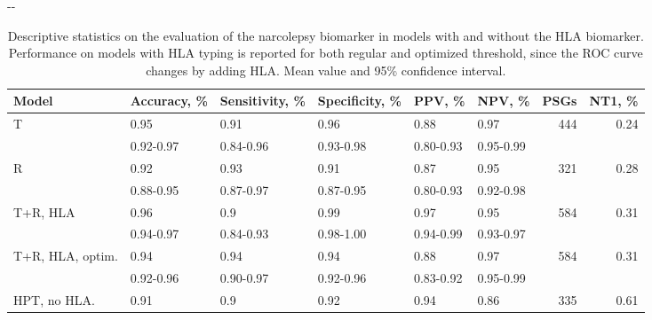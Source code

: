 \begin{table}
    \small
    \begin{adjustwidth*}{}{-\marginparwidth-\marginparsep}
    \caption[Narcolepsy biomarker performance]{Descriptive statistics on the evaluation of the narcolepsy biomarker in models with and without the \ac{HLA} biomarker. 
    Performance on models with \ac{HLA} typing is reported for both regular and optimized threshold, since the \ac{ROC} curve changes by adding \ac{HLA}. Mean value and 95\% confidence interval.}
    \label{tab:paperiii-supptable06}
    \begin{tabular}{@{}llllllrr@{}}
        \toprule
        \textbf{Model}      & \textbf{Accuracy}, \% & \textbf{Sensitivity}, \% & \textbf{Specificity}, \% & \textbf{PPV}, \%  & \textbf{NPV}, \%  & \textbf{\acp{PSG}} & \textbf{\ac{NT1}}, \% \\ \midrule
        T                   & 0.95          & 0.91             & 0.96             & 0.88      & 0.97      & 444       & 0.24                       \\
                            & 0.92-0.97     & 0.84-0.96        & 0.93-0.98        & 0.80-0.93 & 0.95-0.99 &           &                            \\
        R                   & 0.92          & 0.93             & 0.91             & 0.87      & 0.95      & 321       & 0.28                       \\
                            & 0.88-0.95     & 0.87-0.97        & 0.87-0.95        & 0.80-0.93 & 0.92-0.98 &           &                            \\
        \multirow[t]{2}{0.175\textwidth}{T+R, HLA} & 0.96          & 0.9              & 0.99             & 0.97      & 0.95      & 584       & 0.31                       \\
                            & 0.94-0.97     & 0.84-0.93        & 0.98-1.00        & 0.94-0.99 & 0.93-0.97 &           &                            \\
        \multirow[t]{2}{0.175\textwidth}{T+R, HLA, optim.}    & 0.94          & 0.94             & 0.94             & 0.88      & 0.97      & 584       & 0.31                       \\
                            & 0.92-0.96     & 0.90-0.97        & 0.92-0.96        & 0.83-0.92 & 0.95-0.99 &           &                            \\
        \multirow[t]{2}{0.175\textwidth}{HPT, no HLA.}        & 0.91          & 0.9              & 0.92             & 0.94      & 0.86      & 335       & 0.61                       \\

\end{tabular}
\end{adjustwidth*}
\end{table}

